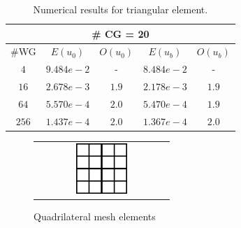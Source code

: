 \begin{table}[h]
	\setlength{\tabcolsep}{2pt} {
		\caption{ Numerical results for triangular element.}
		\label{Tab:hwgcg l1}
		\vspace{-5pt}
		\begin{center}
			\begin{tabular}{c|c|c|c|c}
				\hline
				\multicolumn{5}{c}{\# CG = 20} \\
				\hline
				\#WG & $ E (u_{0}) $ & $ O(u_{0}) $ & $ E(u_{b})  $& $ O(u_{b})  $\\
				\hline
				$ 4 $ & $ 9.484e-2 $ & - & $ 8.484e-2 $ & - \\
				\hline
				$ 16 $ & $ 2.678e-3 $ & $ 1.9 $& $ 2.178e-3 $ & $ 1.9 $ \\
				\hline
				$ 64 $ & $ 5.570e-4 $ & $ 2.0 $ & $ 5.470e-4 $ & $ 1.9 $ \\
				\hline
				$ 256 $ & $ 1.437e-4 $ & $ 2.0 $ & $ 1.367e-4 $ & $ 2.0 $\\
				\hline
			\end{tabular}
		\end{center} }
	\end{table}
	
	\begin{figure}[H]
		\centering
		\begin{tabular}{c}
			\includegraphics[width=0.4\textwidth]{./pics/quadMesh}
		\end{tabular}
		\caption{\footnotesize Quadrilateral mesh elements}
	\end{figure}
	
